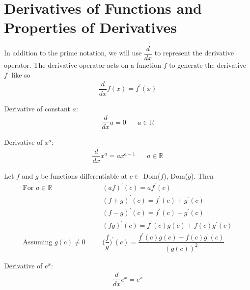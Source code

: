 \newpage
\section{Derivatives of Functions and Properties of Derivatives}

\begin{note}
In addition to the prime notation, we will use $\dfrac{d}{dx}$ to represent the derivative operator. The derivative operator acts on a function $f$ to generate the derivative $f^{'}$ like so
\begin{align*}
    \dfrac{d}{dx}f(x) = f^{'}(x)
\end{align*}
\end{note}

\begin{theorem}
Derivative of constant $a$:
\begin{align*}
    \dfrac{d}{dx}a = 0 \hspace{20pt} a \in \mathbb{R}
\end{align*}
\end{theorem}

\begin{theorem}
Derivative of $x^{a}$:
\begin{align*}
    \dfrac{d}{dx}x^{a} = ax^{a-1} \hspace{20pt} a \in \mathbb{R}
\end{align*}
\end{theorem}

\begin{theorem}
Let $f$ and $g$ be functions differentiable at $c \in$ Dom($f$), Dom($g$). Then
\begin{align*}
    \text{For $a \in \mathbb{R}$} \hspace{20pt} &(af)^{'}(c) = af^{'}(c)\\[2ex]
    &(f+g)^{'}(c) = f^{'}(c) + g^{'}(c)\\[2ex]
    &(f-g)^{'}(c) = f^{'}(c) - g^{'}(c)\\[2ex]
    &(fg)^{'}(c) = f^{'}(c)g(c) + f(c)g^{'}(c)\\[2ex]
    \text{Assuming $g(c) \neq 0$} \hspace{20pt} &\Big(\dfrac{f}{g}\Big)^{'}(c) = \dfrac{f^{'}(c)g(c) - f(c)g^{'}(c)}{(g(c))^{2}}
\end{align*}
\end{theorem}

\begin{theorem}
Derivative of $e^{x}$:
\begin{align*}
    \dfrac{d}{dx}e^{x} = e^{x}
\end{align*}
\end{theorem}

